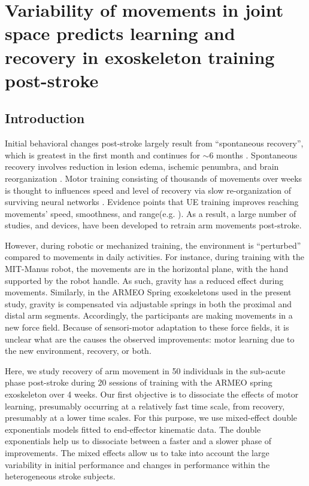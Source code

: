 \chapter{Variability of movements in joint space predicts learning and recovery	in exoskeleton training post-stroke}
\label{cha:armeospring}


\section{Introduction}

Initial behavioral changes post-stroke largely result from “spontaneous recovery”, which is greatest in the first month and continues for $ \sim $6 months \cite{Duncan1992, Duncan2000}. 
Spontaneous recovery involves reduction in lesion edema, ischemic penumbra, and brain reorganization \cite{Bains2014, Murphy2009}. 
Motor training consisting of thousands of movements over weeks is thought to influences speed and level of recovery via slow re-organization of surviving neural networks \cite{Nudo1996, Pavlides1993, Wolf2006, Lincoln1996}. 
Evidence points that UE training improves reaching movements’ speed, smoothness, and range(e.g. \cite{Anton1996}).
As a result, a large number of studies, and devices, have been developed to retrain arm movements post-stroke. 

However, during robotic or mechanized training, the environment is “perturbed” compared to movements in daily activities. 
For instance, during training with the MIT-Manus robot, the movements are in the horizontal plane, with the hand supported by the robot handle. 
As such, gravity has a reduced effect during movements. 
Similarly, in the ARMEO Spring exoskeletons used in the present study, gravity is compensated via adjustable springs in both the proximal and distal arm segments.
Accordingly, the participants are making movements in a new force field. 
Because of sensori-motor adaptation to these force fields, it is unclear what are the causes the observed improvements: motor learning due to the new environment, recovery, or both. 

Here, we study recovery of arm movement in 50 individuals in the sub-acute phase post-stroke during 20 sessions of training with the ARMEO spring exoskeleton over 4 weeks.
Our first objective is to dissociate the effects of motor learning, presumably occurring at a relatively fast time scale, from recovery, presumably at a lower time scales.  
For this purpose, we use mixed-effect double exponentials models fitted to end-effector kinematic data. 
The double exponentials help us to dissociate between a faster and a slower phase of improvements. 
The mixed effects allow us to take into account the large variability in initial performance and changes in performance within the heterogeneous stroke subjects.

